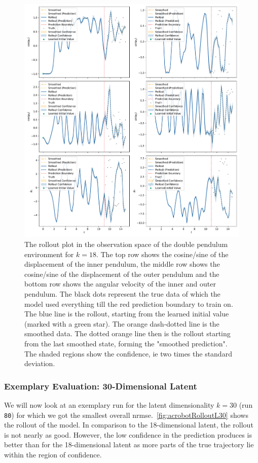 			\begin{figure}
				\centering
				\includegraphics[width=\linewidth]{figures/results/acrobot-gym/run-latent-dim-18/rollout-observations-N0.pdf}
				\caption{The rollout plot in the observation space of the double pendulum environment for \(k = 18\). The top row shows the cosine/sine of the displacement of the inner pendulum, the middle row shows the cosine/sine of the displacement of the outer pendulum and the bottom row shows the angular velocity of the inner and outer pendulum. The black dots represent the true data of which the model used everything till the red prediction boundary to train on. The blue line is the rollout, starting from the learned initial value (marked with a green star). The orange dash-dotted line is the smoothed data. The dotted orange line then is the rollout starting from the last smoothed state, forming the "smoothed prediction". The shaded regions show the confidence, \ac{ie} two times the standard deviation.}
				\label{fig:acrobotRolloutL18}
			\end{figure}

		\subsubsection{Exemplary Evaluation: 30-Dimensional Latent}
			We will now look at an exemplary run for the latent dimensionality \( k = 30 \) (run \texttt{80}) for which we got the smallest overall \ac{nrmse}.~\autoref{fig:acrobotRolloutL30} shows the rollout of the model. In comparison to the 18-dimensional latent, the rollout is not nearly as good. However, the low confidence in the prediction produces is better than for the 18-dimensional latent as more parts of the true trajectory lie within the region of confidence.

